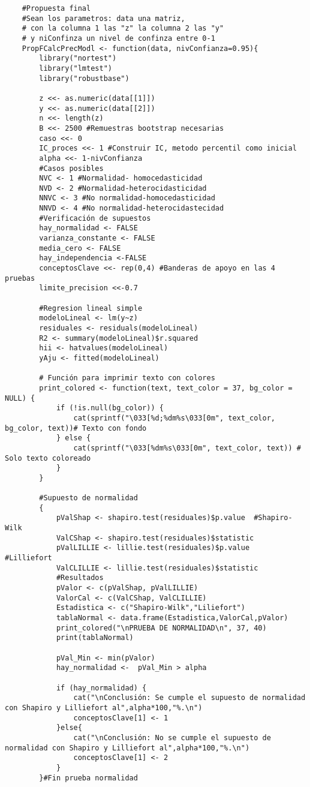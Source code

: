 \begin{verbatim}
	#Propuesta final
	#Sean los parametros: data una matriz,
	# con la columna 1 las "z" la columna 2 las "y" 
	# y niConfinza un nivel de confinza entre 0-1
	PropFCalcPrecModl <- function(data, nivConfianza=0.95){
		library("nortest")
		library("lmtest")
		library("robustbase")
		
		z <<- as.numeric(data[[1]])
		y <<- as.numeric(data[[2]])
		n <<- length(z)
		B <<- 2500 #Remuestras bootstrap necesarias
		caso <<- 0
		IC_proces <<- 1 #Construir IC, metodo percentil como inicial
		alpha <<- 1-nivConfianza
		#Casos posibles
		NVC <- 1 #Normalidad- homocedasticidad
		NVD <- 2 #Normalidad-heterocidasticidad
		NNVC <- 3 #No normalidad-homocedasticidad
		NNVD <- 4 #No normalidad-heterocidastecidad 
		#Verificación de supuestos
		hay_normalidad <- FALSE
		varianza_constante <- FALSE
		media_cero <- FALSE
		hay_independencia <-FALSE
		conceptosClave <<- rep(0,4) #Banderas de apoyo en las 4 pruebas
		limite_precision <<-0.7
		
		#Regresion lineal simple
		modeloLineal <- lm(y~z)
		residuales <- residuals(modeloLineal)
		R2 <- summary(modeloLineal)$r.squared
		hii <- hatvalues(modeloLineal)
		yAju <- fitted(modeloLineal)
		
		# Función para imprimir texto con colores 
		print_colored <- function(text, text_color = 37, bg_color = NULL) {
			if (!is.null(bg_color)) {
				cat(sprintf("\033[%d;%dm%s\033[0m", text_color, bg_color, text))# Texto con fondo
			} else {
				cat(sprintf("\033[%dm%s\033[0m", text_color, text)) # Solo texto coloreado
			}
		}
		
		#Supuesto de normalidad
		{
			pValShap <- shapiro.test(residuales)$p.value  #Shapiro-Wilk
			ValCShap <- shapiro.test(residuales)$statistic
			pValLILLIE <- lillie.test(residuales)$p.value   #Lilliefort
			ValCLILLIE <- lillie.test(residuales)$statistic
			#Resultados
			pValor <- c(pValShap, pValLILLIE)
			ValorCal <- c(ValCShap, ValCLILLIE)
			Estadistica <- c("Shapiro-Wilk","Liliefort")
			tablaNormal <- data.frame(Estadistica,ValorCal,pValor)
			print_colored("\nPRUEBA DE NORMALIDAD\n", 37, 40)
			print(tablaNormal)
			
			pVal_Min <- min(pValor)
			hay_normalidad <-  pVal_Min > alpha
			
			if (hay_normalidad) {
				cat("\nConclusión: Se cumple el supuesto de normalidad con Shapiro y Lilliefort al",alpha*100,"%.\n")
				conceptosClave[1] <- 1
			}else{
				cat("\nConclusión: No se cumple el supuesto de normalidad con Shapiro y Lilliefort al",alpha*100,"%.\n")
				conceptosClave[1] <- 2
			}
		}#Fin prueba normalidad
		

\end{verbatim}

